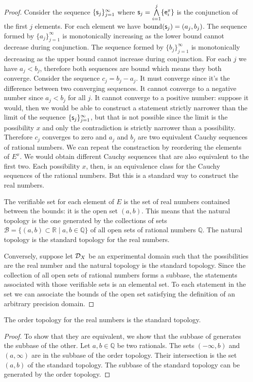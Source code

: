 \documentclass[11pt,letterpaper,fleqn]{memoir} %
\begin{document}
\begin{mathSection}
\begin{proof}
		Consider the sequence $\{\stmt_j\}_{j=1}^{\infty}$ where $\stmt_j = \bigAND\limits_{i=1}^j\{\obs[e]^x_i\}$ is the conjunction of the first $j$ elements. For each element we have $\operatorname{bound}(\stmt_j) = (a_j, b_j)$. The sequence formed by $\{a_j\}_{j=1}^{\infty}$ is monotonically increasing as the lower bound cannot decrease during conjunction. The sequence formed by $\{b_j\}_{j=1}^{\infty}$ is monotonically decreasing as the upper bound cannot increase during conjunction. For each $j$ we have $a_j < b_j$, therefore both sequences are bound which means they both converge. Consider the sequence $c_j = b_j - a_j$. It must converge since it's the difference between two converging sequences. It cannot converge to a negative number since $a_j < b_j$ for all $j$. It cannot converge to a positive number: suppose it would, then we would be able to construct a statement strictly narrower than the limit of the sequence $\{\stmt_j\}_{j=1}^{\infty}$, but that is not possible since the limit is the possibility $x$ and only the contradiction is strictly narrower than a possibility. Therefore $c_j$ converges to zero and $a_j$ and $b_j$ are two equivalent Cauchy sequences of rational numbers. We can repeat the constraction by reordering the elements of $E^x$. We would obtain different Cauchy sequences that are also equivalent to the first two. Each possibility $x$, then, is an equivalence class for the Cauchy sequences of the rational numbers. But this is a standard way to construct the real numbers.
		
		The verifiable set for each element of $E$ is the set of real numbers contained between the bounds: it is the open set $(a,b)$. This means that the natural topology is the one generated by the collections of sets $\mathcal{B} = \{ (a,b) \subset \mathbb{R} \; | \; a,b \in \mathbb{Q} \}$ of all open sets of rational numbers $\mathbb{Q}$. The natural topology is the standard topology for the real numbers.
		
		Conversely, suppose let $\edomain_X$ be an experimental domain such that the possibilities are the real number and the natural topology is the standard topology. Since the collection of all open sets of rational numbers forms a subbase, the statements associated with those verifiable sets is an elemental set. To each statement in the set we can associate the bounds of the open set satisfying the definition of an arbitrary precision domain.
	\end{proof}
	
	\begin{prop}
		The order topology for the real numbers is the standard topology.
	\end{prop}
	\begin{proof}
		To show that they are equivalent, we show that the subbase of generates the subbase of the other. Let $a,b \in \mathbb{Q}$ be two rationals. The sets $(-\infty, b)$ and $(a, \infty)$ are in the subbase of the order topology. Their intersection is the set $(a, b)$ of the standard topology. The subbase of the standard topology can be generated by the order topology.
		

\end{proof}
\end{mathSection}
\end{document}
